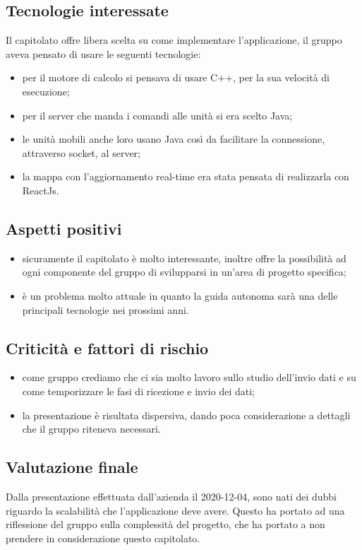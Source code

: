 \subsection{Tecnologie interessate}
Il capitolato offre libera scelta su come implementare l'applicazione, il gruppo aveva pensato di usare le seguenti tecnologie:
\begin{itemize}
\item per il motore di calcolo si pensava di usare C++, per la sua velocità di esecuzione;
\item per il server che manda i comandi alle unità si era scelto Java;
\item le unità mobili anche loro usano Java così da facilitare la connessione, attraverso socket, al server;
\item la mappa con l'aggiornamento real-time era stata pensata di realizzarla con ReactJs.
\end{itemize}

\subsection{Aspetti positivi}
\begin{itemize}
\item sicuramente il capitolato è molto interessante, inoltre offre la possibilità ad ogni componente del gruppo di svilupparsi in un'area di progetto specifica;
\item è un problema molto attuale in quanto la guida autonoma sarà una delle principali tecnologie nei prossimi anni.
\end{itemize}

\subsection{Criticità e fattori di rischio}
\begin{itemize}
\item come gruppo crediamo che ci sia molto lavoro sullo studio dell'invio dati e su come temporizzare le fasi di ricezione e invio dei dati;
\item la presentazione è risultata dispersiva, dando poca considerazione a dettagli che il gruppo riteneva necessari.  
\end{itemize}

\subsection{Valutazione finale}
Dalla presentazione effettuata dall'azienda il 2020-12-04, sono nati dei dubbi riguardo la scalabilità che l'applicazione deve avere. Questo ha portato ad una riflessione del gruppo sulla complessità del progetto, che ha portato a non prendere in considerazione questo capitolato.